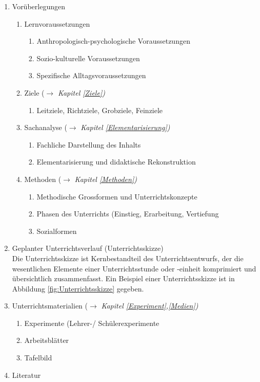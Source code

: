 \begin{enumerate}
\item Vor\"{u}berlegungen

	\begin{enumerate}
	\item Lernvoraussetzungen
		\begin{enumerate}
		\item Anthropologisch-psychologische Voraussetzungen
		\item Sozio-kulturelle Voraussetzungen
		\item Spezifische Alltagsvoraussetzungen
		\end{enumerate}
	\item	Ziele ($\to$ \emph{Kapitel \ref{Ziele})}
		\begin{enumerate}
		\item Leitziele, Richtziele, Grobziele, Feinziele
		\end{enumerate}
	\item Sachanalyse ($\to$ \emph{Kapitel \ref{Elementarisierung})}
		\begin{enumerate}
		\item Fachliche Darstellung des Inhalts
		\item Elementarisierung und didaktische Rekonstruktion
		\end{enumerate}
	\item Methoden ($\to$ \emph{Kapitel \ref{Methoden})}
		\begin{enumerate}
		\item Methodische Grossformen und Unterrichtskonzepte
		\item Phasen des Unterrichts (Einstieg, Erarbeitung, Vertiefung
		\item Sozialformen
		\end{enumerate}
	\end{enumerate}

\item  Geplanter Unterrichtsverlauf (Unterrichtsskizze) 
	\\
	 Die Unterrichtsskizze ist Kernbestandteil des Unterrichtsentwurfs, der die wesentlichen Elemente einer Unterrichtsstunde oder -einheit komprimiert und \"{u}bersichtlich zusammenfasst. Ein Beispiel einer Unterrichtsskizze ist in Abbildung \ref{fig:Unterrichtsskizze} gegeben.

\item Unterrichtsmaterialien ($\to$ \emph{Kapitel \ref{Experiment},\ref{Medien})}
	\begin{enumerate}
	\item Experimente (Lehrer-/ Sch\"{u}lerexperimente
	\item Arbeitsbl\"{a}tter
	\item Tafelbild
	\end{enumerate}

\item Literatur
\end{enumerate}

